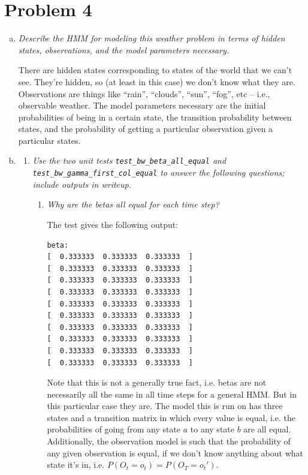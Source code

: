 \documentclass{article}
\begin{document}
\section*{Problem 4}
\begin{enumerate}[(a)]
\item \emph{Describe the HMM for modeling this weather problem in terms of hidden
  states, observations, and the model parameters necessary.}

  There are hidden states corresponding to states of the world that we can't
  see. They're hidden, so (at least in this case) we don't know what they are.
  Observations are things like ``rain'', ``clouds'', ``sun'', ``fog'', etc --
  i.e., observable weather.
  The model parameters necessary are the initial probabilities of being in a
  certain state, the transition probability between states, and the probability
  of getting a particular observation given a particular states.

\item
  \begin{enumerate}
    \setcounter{enumii}2
  \item \emph{Use the two unit tests \emph{\texttt{test\_bw\_beta\_all\_equal}}
    and
    \emph{\texttt{test\_bw\_gamma\_first\_col\_equal}} to answer the following questions;
    include outputs in writeup.}

    \begin{enumerate}[(1)]
    \item \emph{Why are the betas all equal for each time step?}

      The test gives the following output:
\begin{verbatim}
beta:
[  0.333333  0.333333  0.333333  ]
[  0.333333  0.333333  0.333333  ]
[  0.333333  0.333333  0.333333  ]
[  0.333333  0.333333  0.333333  ]
[  0.333333  0.333333  0.333333  ]
[  0.333333  0.333333  0.333333  ]
[  0.333333  0.333333  0.333333  ]
[  0.333333  0.333333  0.333333  ]
[  0.333333  0.333333  0.333333  ]
[  0.333333  0.333333  0.333333  ]
\end{verbatim}

      Note that this is not a generally true fact, i.e. betas are not
      necessarily all the same in all time steps for a general HMM.  But
      in this particular case they are. The model this is run on has
      three states and a transition matrix in which every value is
      equal, i.e. the probabilities of going from any state $a$ to any
      state $b$ are all equal.  Additionally, the observation model is
      such that the probability of any given observation is equal, if we
      don't know anything about what state it's in,
      i.e. $P(O_t=o_t)=P(O_T=o_t')$.


\end{enumerate}
\end{enumerate}
\end{enumerate}
\end{document}
